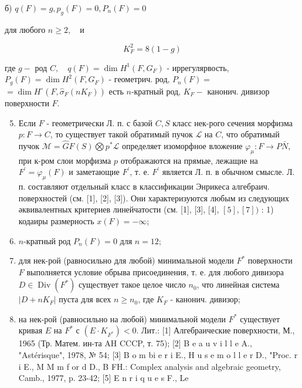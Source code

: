 \documentclass[10pt]{article}
\begin{document}
б) $q(F)=g, p_{g}(F)=0, P_{n}(F)=0$



для любого $n \geqslant 2, \quad и$



\[

K_{F}^{2}=8(1-g)

\]



где $g-$ род $C, \quad q(F)=\operatorname{dim} H^{1}\left(F, G_{F}\right)$ - иррегулярвость, $P_{g}(F)=\operatorname{dim} H^{2}\left(F, G_{F}\right)$ - геометрич. род, $P_{n}(F)=$ $=\operatorname{dim} H^{\circ}\left(F, \hat{\sigma}_{F}\left(n K_{F}\right)\right)$ есть $n$-кратный род, $K_{F}-$ канонич. дивизор поверхности $F$.



\begin{enumerate}

  \setcounter{enumi}{4}

  \item Если $F$ - геометрически Л. п. с базой $C, S$ класс нек-рого сечения морфизма $p: F \rightarrow C$, то существует такой обратимый пучок $\mathscr{L}$ на $C$, что обратимый пучок $\mathscr{M}=\widehat{G} F(S) \bigotimes p^{*} \mathscr{L}$ определяет изоморфное вложение $\varphi_{\mu}: F \rightarrow P \bar{N}$, при к-ром слои морфизма $p$ отображаются на прямые, лежащие на $F^{\prime}=\varphi_{\mu}(F)$ и заметающие $F^{\prime}$, т. е. $F^{\prime}$ является Л. п. в обычном смысле. Л. п. составляют отдельный класс в классификации Энрикеса алгебраич. поверхностей (см. [1], [2], [3]). Они характеризуются любым из следующих әквивалентных критериев линейчатости (см. [1], [3], [4], $[5],[7])$ : 1) кодаиры размерность $x(F)=-\infty$;



  \item $n$-кратный род $P_{n}(F)=0$ для $n=12$;



  \item для нек-рой (равносильно для любой) минимальной модели $F^{*}$ поверхности $F$ выполняется условие обрыва присоединения, т. е. для любого дивизора $D \in \operatorname{Div}\left(F^{*}\right)$ существует такое целое число $n_{0}$, что линейная система $\left|D+n K_{F}\right|$ пуста для всех $n \geqslant n_{0}$, где $K_{F}$ - канонич. дивизор;



  \item на нек-рой (равносильно на любой) минимальной модели $F^{*}$ существует кривая $E$ на $F^{*}$ с $\left(E \cdot K_{F^{*}}\right)<0$. Лит.: [1] Алгебраические поверхности, М., 1965 (Тр. Матем. ин-та AH CCCP, т. 75); [2] B e a u v i l l e A., "Astérisque", 1978, № 54; [3] B o m bi e r i E., H u s e m o l l e r D., "Proc. r i E., M M m f or d D., B FH.: Complex analysis and algebraic geometry, Camb., 1977, p. 23-42; [5] E n r i q u e s F., Le



\end{enumerate}
\end{document}
